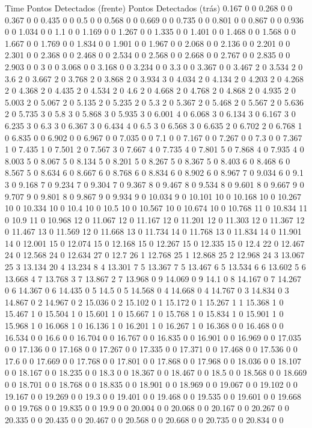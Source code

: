 Time	Pontos Detectados (frente)	Pontos Detectados (trás)
0.167	0	0
0.268	0	0
0.367	0	0
0.435	0	0
0.5	0	0
0.568	0	0
0.669	0	0
0.735	0	0
0.801	0	0
0.867	0	0
0.936	0	0
1.034	0	0
1.1	0	0
1.169	0	0
1.267	0	0
1.335	0	0
1.401	0	0
1.468	0	0
1.568	0	0
1.667	0	0
1.769	0	0
1.834	0	0
1.901	0	0
1.967	0	0
2.068	0	0
2.136	0	0
2.201	0	0
2.301	0	0
2.368	0	0
2.468	0	0
2.534	0	0
2.568	0	0
2.668	0	0
2.767	0	0
2.835	0	0
2.903	0	0
3	0	0
3.068	0	0
3.168	0	0
3.234	0	0
3.3	0	0
3.367	0	0
3.467	2	0
3.534	2	0
3.6	2	0
3.667	2	0
3.768	2	0
3.868	2	0
3.934	3	0
4.034	2	0
4.134	2	0
4.203	2	0
4.268	2	0
4.368	2	0
4.435	2	0
4.534	2	0
4.6	2	0
4.668	2	0
4.768	2	0
4.868	2	0
4.935	2	0
5.003	2	0
5.067	2	0
5.135	2	0
5.235	2	0
5.3	2	0
5.367	2	0
5.468	2	0
5.567	2	0
5.636	2	0
5.735	3	0
5.8	3	0
5.868	3	0
5.935	3	0
6.001	4	0
6.068	3	0
6.134	3	0
6.167	3	0
6.235	3	0
6.3	3	0
6.367	3	0
6.434	4	0
6.5	3	0
6.568	3	0
6.635	2	0
6.702	2	0
6.768	1	0
6.835	0	0
6.902	0	0
6.967	0	0
7.035	0	0
7.1	0	0
7.167	0	0
7.267	0	0
7.3	0	0
7.367	1	0
7.435	1	0
7.501	2	0
7.567	3	0
7.667	4	0
7.735	4	0
7.801	5	0
7.868	4	0
7.935	4	0
8.003	5	0
8.067	5	0
8.134	5	0
8.201	5	0
8.267	5	0
8.367	5	0
8.403	6	0
8.468	6	0
8.567	5	0
8.634	6	0
8.667	6	0
8.768	6	0
8.834	6	0
8.902	6	0
8.967	7	0
9.034	6	0
9.1	3	0
9.168	7	0
9.234	7	0
9.304	7	0
9.367	8	0
9.467	8	0
9.534	8	0
9.601	8	0
9.667	9	0
9.707	9	0
9.801	8	0
9.867	9	0
9.934	9	0
10.034	9	0
10.101	10	0
10.168	10	0
10.267	10	0
10.334	10	0
10.4	10	0
10.5	10	0
10.567	10	0
10.674	10	0
10.768	11	0
10.834	11	0
10.9	11	0
10.968	12	0
11.067	12	0
11.167	12	0
11.201	12	0
11.303	12	0
11.367	12	0
11.467	13	0
11.569	12	0
11.668	13	0
11.734	14	0
11.768	13	0
11.834	14	0
11.901	14	0
12.001	15	0
12.074	15	0
12.168	15	0
12.267	15	0
12.335	15	0
12.4	22	0
12.467	24	0
12.568	24	0
12.634	27	0
12.7	26	1
12.768	25	1
12.868	25	2
12.968	24	3
13.067	25	3
13.134	20	4
13.234	8	4
13.301	7	5
13.367	7	5
13.467	6	5
13.534	6	6
13.602	5	6
13.668	4	7
13.768	3	7
13.867	2	7
13.968	0	9
14.069	0	9
14.1	0	8
14.167	0	7
14.267	0	6
14.367	0	6
14.435	0	5
14.5	0	5
14.568	0	4
14.668	0	4
14.767	0	3
14.834	0	3
14.867	0	2
14.967	0	2
15.036	0	2
15.102	0	1
15.172	0	1
15.267	1	1
15.368	1	0
15.467	1	0
15.504	1	0
15.601	1	0
15.667	1	0
15.768	1	0
15.834	1	0
15.901	1	0
15.968	1	0
16.068	1	0
16.136	1	0
16.201	1	0
16.267	1	0
16.368	0	0
16.468	0	0
16.534	0	0
16.6	0	0
16.704	0	0
16.767	0	0
16.835	0	0
16.901	0	0
16.969	0	0
17.035	0	0
17.136	0	0
17.168	0	0
17.267	0	0
17.335	0	0
17.371	0	0
17.468	0	0
17.536	0	0
17.6	0	0
17.669	0	0
17.768	0	0
17.801	0	0
17.868	0	0
17.968	0	0
18.036	0	0
18.107	0	0
18.167	0	0
18.235	0	0
18.3	0	0
18.367	0	0
18.467	0	0
18.5	0	0
18.568	0	0
18.669	0	0
18.701	0	0
18.768	0	0
18.835	0	0
18.901	0	0
18.969	0	0
19.067	0	0
19.102	0	0
19.167	0	0
19.269	0	0
19.3	0	0
19.401	0	0
19.468	0	0
19.535	0	0
19.601	0	0
19.668	0	0
19.768	0	0
19.835	0	0
19.9	0	0
20.004	0	0
20.068	0	0
20.167	0	0
20.267	0	0
20.335	0	0
20.435	0	0
20.467	0	0
20.568	0	0
20.668	0	0
20.735	0	0
20.834	0	0
